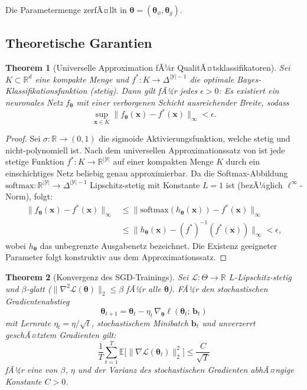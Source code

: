 ﻿\documentclass[12pt,a4paper]{article}
\theoremstyle{plain}
\newtheorem{theorem}{Theorem}[section]
\theoremstyle{definition}
\begin{document}
	Die Parametermenge zerfÃ¤llt in $\boldsymbol{\theta} = (\boldsymbol{\theta}_\phi, \boldsymbol{\theta}_g)$.
	
	\subsection{Theoretische Garantien}
	
	\begin{theorem}[Universelle Approximation fÃ¼r QualitÃ¤tsklassifikatoren]
		\label{thm:ua}
		Sei $K \subset \mathbb{R}^d$ eine kompakte Menge und
		$f^* : K \to \Delta^{|\mathcal{Y}|-1}$ die optimale Bayes-Klassifikationsfunktion
		(stetig). Dann gilt fÃ¼r jedes $\epsilon > 0$: Es existiert ein neuronales
		Netz $f_{\boldsymbol{\theta}}$ mit einer verborgenen Schicht ausreichender
		Breite, sodass
		\[
		\sup_{\mathbf{x} \in K}
		\bigl\|f_{\boldsymbol{\theta}}(\mathbf{x}) - f^*(\mathbf{x})\bigr\|_\infty
		< \epsilon.
		\]
	\end{theorem}
	
	\begin{proof}
		Sei $\sigma : \mathbb{R} \to (0,1)$ die sigmoide Aktivierungsfunktion,
		welche stetig und nicht-polynomiell ist. Nach dem universellen
		Approximationssatz von \cite{hornik1989} ist jede stetige Funktion
		$f^* : K \to \mathbb{R}^{|\mathcal{Y}|}$ auf einer kompakten Menge $K$
		durch ein einschichtiges Netz beliebig genau approximierbar. Da die
		Softmax-Abbildung $\mathrm{softmax} : \mathbb{R}^{|\mathcal{Y}|} \to
		\Delta^{|\mathcal{Y}|-1}$ Lipschitz-stetig mit Konstante $L = 1$ ist
		(bezÃ¼glich $\ell^\infty$-Norm), folgt:
		\begin{align*}
			\bigl\|f_{\boldsymbol{\theta}}(\mathbf{x}) - f^*(\mathbf{x})\bigr\|_\infty
			&\leq \bigl\|\mathrm{softmax}(h_{\boldsymbol{\theta}}(\mathbf{x}))
			- f^*(\mathbf{x})\bigr\|_\infty \\
			&\leq \bigl\|h_{\boldsymbol{\theta}}(\mathbf{x})
			- (f^*)^{-1}(f^*(\mathbf{x}))\bigr\|_\infty
			< \epsilon,
		\end{align*}
		wobei $h_{\boldsymbol{\theta}}$ das unbegrenzte Ausgabenetz bezeichnet.
		Die Existenz geeigneter Parameter folgt konstruktiv aus dem
		Approximationssatz.
	\end{proof}
	
	\begin{theorem}[Konvergenz des SGD-Trainings]
		\label{thm:sgd}
		Sei $\mathcal{L} : \Theta \to \mathbb{R}$ $L$-Lipschitz-stetig und
		$\beta$-glatt ($\|\nabla^2 \mathcal{L}(\boldsymbol{\theta})\|_2 \leq \beta$
		fÃ¼r alle $\boldsymbol{\theta}$). FÃ¼r den stochastischen Gradientenabstieg
		\[
		\boldsymbol{\theta}_{t+1} = \boldsymbol{\theta}_t -
		\eta_t \,\nabla_{\boldsymbol{\theta}} \ell(\boldsymbol{\theta}_t;\,
		\mathbf{b}_t)
		\]
		mit Lernrate $\eta_t = \eta / \sqrt{t}$, stochastischem Minibatch
		$\mathbf{b}_t$ und unverzerrt geschÃ¤tztem Gradienten gilt:
		\[
		\frac{1}{T} \sum_{t=1}^{T}
		\mathbb{E}\bigl[\bigl\|\nabla \mathcal{L}(\boldsymbol{\theta}_t)\bigr\|_2^2\bigr]
		\leq \frac{C}{\sqrt{T}}
		\]
		fÃ¼r eine von $\beta$, $\eta$ und der Varianz des stochastischen Gradienten
		abhÃ¤ngige Konstante $C > 0$.
	\end{theorem}
	
\end{document}
